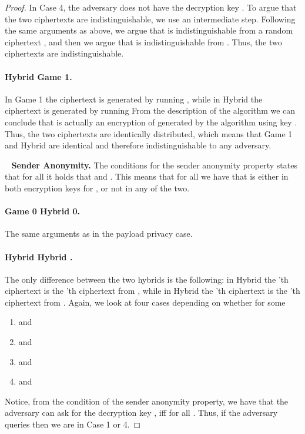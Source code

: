\documentclass{llncs}
\begin{document}
\begin{proof}
In Case 4, the adversary does not have the decryption key . To argue that the two ciphertexts are indistinguishable, we use an intermediate step. Following the same arguments as above, we argue that  is indistinguishable from a random ciphertext , and then we argue that  is indistinguishable from .
Thus, the two ciphertexts are indistinguishable.


\paragraph{Hybrid   Game 1.} 
In  Game 1 the ciphertext is generated by running , while in Hybrid  the ciphertext is generated by running 
From the description of the algorithm  we can conclude that  is actually an encryption of  generated by the  algorithm using key .
Thus, the two ciphertexts are identically distributed, which means that Game 1 and Hybrid  are identical and therefore indistinguishable to any adversary.

\ \newline
\noindent\textbf{Sender Anonymity.} 
The conditions for the sender anonymity property states that for all  it holds that  and .
This means that for all  we have that  is either in both encryption keys  for , or not in any of the two.


\paragraph{Game 0  Hybrid 0.} The same arguments as in the payload privacy case.

\paragraph{Hybrid   Hybrid .} 
The only difference between the two hybrids is the following: in Hybrid  the 'th \oACE ciphertext is the 'th ciphertext from , while in Hybrid  the 'th \oACE ciphertext is the 'th ciphertext from .
Again, we look at four cases depending on whether  for some 
\begin{enumerate}
\item  and 
\item  and 
\item  and 
\item  and 
\end{enumerate}

Notice, from the condition of the sender anonymity property, we have that the adversary can ask for the decryption key , iff  for all . Thus, if the adversary queries  then we are in Case 1 or 4. 


\end{proof}
\end{document}
